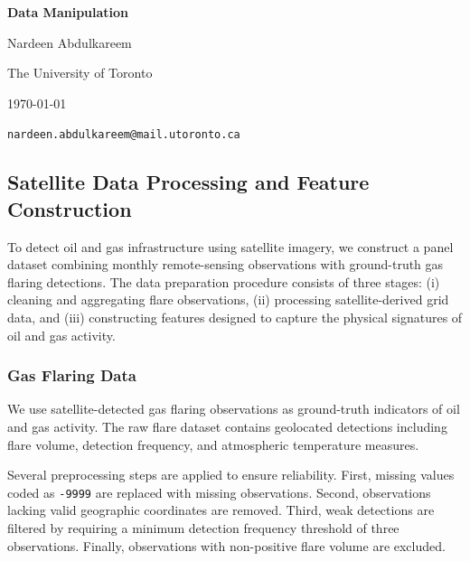 \documentclass[12pt]{article}
\begin{document}
\begin{titlepage}
    \thispagestyle{empty} %
    \centering
    \vspace*{\fill}

    {\Large \textbf{Data Manipulation} \par}

    \vspace{3em}
    {\large Nardeen Abdulkareem \par}
    {\normalsize The University of Toronto \par}
    {\normalsize \today \par}
    {\texttt{nardeen.abdulkareem@mail.utoronto.ca} \par}

    \vspace*{\fill}
\end{titlepage}
\clearpage

\subsection{Satellite Data Processing and Feature Construction}

To detect oil and gas infrastructure using satellite imagery, we construct a panel dataset combining monthly remote-sensing observations with ground-truth gas flaring detections. The data preparation procedure consists of three stages: (i) cleaning and aggregating flare observations, (ii) processing satellite-derived grid data, and (iii) constructing features designed to capture the physical signatures of oil and gas activity.

\subsubsection{Gas Flaring Data}

We use satellite-detected gas flaring observations as ground-truth indicators of oil and gas activity. The raw flare dataset contains geolocated detections including flare volume, detection frequency, and atmospheric temperature measures.

Several preprocessing steps are applied to ensure reliability. First, missing values coded as \texttt{-9999} are replaced with missing observations. Second, observations lacking valid geographic coordinates are removed. Third, weak detections are filtered by requiring a minimum detection frequency threshold of three observations. Finally, observations with non-positive flare volume are excluded.
\end{document}

